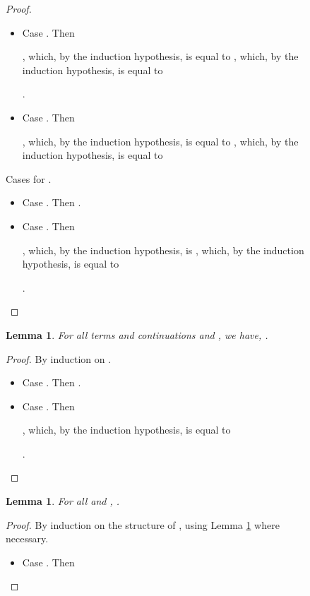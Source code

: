 \documentclass{LMCS}
\newtheorem{lemma}[theorem]{Lemma}
\begin{document}
\begin{figure}
{\begin{proof}
\begin{myenumerate}
\begin{itemize}
	  ,
	  which, by the induction hypothesis, is equal to
	  ,
	  which, by the induction hypothesis, is equal to
	  
	  .

	\item Case . Then
	  
	  ,
	  which, by the induction hypothesis, is equal to
	  ,
	  which, by the induction hypothesis, is equal to
	  
	  .

	\item Case . Then 
	  
	  ,
	  which, by the induction hypothesis, is equal to
	  ,
	  which, by the induction hypothesis, is equal to
	  
	  
      \end{itemize}
    \item Cases for .
      \begin{itemize}
	\item Case . Then .
	\item Case . Then 
	  
	  ,
	  which, by the induction hypothesis, is 
	  ,
	  which, by the induction hypothesis, is equal to
	  
	  .
	  \qedhere
      \end{itemize}
  \end{myenumerate}
\end{proof}

\begin{lemma}
  \label{lem:continuation-composition-a} For all terms  and continuations
   and , we have,
  .
\end{lemma}
\begin{proof}
  By induction on .
  \begin{itemize}
    \item Case . Then .
    \item Case . Then 
      
      ,
      which, by the induction hypothesis, is equal to
      
      .
      \qedhere
  \end{itemize}
\end{proof}

\begin{lemma}
  {\label{lem:continuation-substitution-a} For all  and
  , }.
\end{lemma}
\begin{proof}
  By induction on the structure of , using Lemma \ref{lem:continuation-composition-a}
  where necessary.
  \begin{itemize}
    \item Case . Then 
      

\end{itemize}
\end{proof}}
\end{figure}
\end{document}
